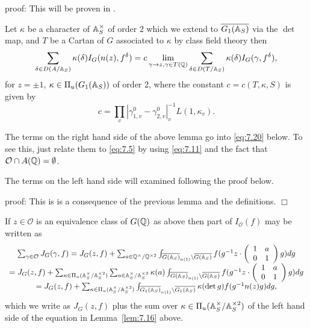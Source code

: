 proof: This will be proven in \cite{J3}.

\begin{lemma}\label{lem:7.16} Let $\kappa$ be a character of
$\mathbb{A} _S^\times $ of order 2 which we extend to
$\overline{G_1(\mathbb{A} _S)}$ via the $\det$ map,
and $T$ be a Cartan of $G$ associated to $\kappa$ by class field
theory then
\begin{equation}\label{eq:7.16}
\sum_{\delta\in D(A/\mathbb{A} _S)}
\kappa(\delta)I_G(n(z),f^\delta)
=c
\lim_{ \gamma\rightarrow z , \gamma\in T(\mathbb{Q} )}
\sum_{\delta\in D(T/\mathbb{A} _S)}
\kappa(\delta)I_G (\gamma, f^\delta),
\end{equation}
for $z =\pm 1$, $\kappa \in \Pi _u(G_1(\mathbb{A} _S))$ of order 2,
where the constant $c=c(T,\kappa,S)$ is given by
\[
c=\prod_v |\gamma_{1,v}^0-\gamma_{2,v}^0|_v^{-1}L(1,\kappa_v) .
\]
\end{lemma}

\begin{remark}\label{rem:7.17} The terms on the right hand side of the above
lemma go into \eqref{eq:7.20} below. To see this, just relate them to
\eqref{eq:7.5} by using \eqref{eq:7.11} and the fact that
${\mathcal{O}}\cap A(\mathbb{Q} ) =\emptyset$.

The terms on the left hand side will examined following the proof
below.
\end{remark}

proof: This is is a consequence of the previous lemma and the
definitions. $\Box$

If $z\in {\mathcal{O}}$ is an equivalence class of $G(\mathbb{Q} )$
as above then part of $I_{\mathcal{O}}(f)$ may be written as
\begin{equation}\label{eq:7.17}
\begin{array}{c}
\sum_{\gamma\in {\mathcal{O}}} J_G(\gamma,f)
=J_G(z,f)+\sum_{a\in \mathbb{Q} ^{\times}/\mathbb{Q} ^{\times 2}}
\int_{\overline{G(\mathbb{A} _S)}_{n(1)}
\backslash \overline{G(\mathbb{A} _S)}} f(g^{-1} z\cdot
\left(
\begin{array}{cc}
1 & a\\
0 & 1
\end{array}
\right)
g)dg\\
=J_G(z,f)+
\sum_{\kappa \in \Pi_u(\mathbb{A} _S^{\times}/\mathbb{A} _S^{\times 2})}
\sum_{a \in \mathbb{A} _S^{\times}/\mathbb{A} _S^{\times 2}}
\kappa (a)
\int_{\overline{G(\mathbb{A} _S)}_{n(1)}
\backslash \overline{G(\mathbb{A} _S)}} f(g^{-1} z\cdot
\left(
\begin{array}{cc}
1 & a\\
0 & 1
\end{array}
\right)
g)dg\\
=J_G(z,f)+
\sum_{\kappa \in \Pi_u(\mathbb{A} _S^{\times}/\mathbb{A} _S^{\times 2})}
\int_{\overline{G_1(\mathbb{A} _S)}_{n(1)}
\backslash \overline{G_1(\mathbb{A} _S)}} \kappa(\det{g})
f(g^{-1} n(z) g)dg,
\end{array}
\end{equation}
which we write as $J_G(z,f)$ plus the sum over
$\kappa \in \Pi_u(\mathbb{A} _S^{\times}/\mathbb{A} _S^{\times 2})$
of the left hand side of the equation in Lemma~\ref{lem:7.16} above.

